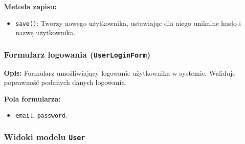 \documentclass[12pt,a4paper,oneside]{article}
\theoremstyle{definition}
\numberwithin{equation}{section}
\begin{document}
\textbf{Metoda zapisu:}
\begin{itemize}
    \item \texttt{save()}: Tworzy nowego użytkownika, ustawiając dla niego unikalne hasło i nazwę użytkownika.
\end{itemize}

\subsubsection*{Formularz logowania (\texttt{UserLoginForm})}

\textbf{Opis:}
Formularz umożliwiający logowanie użytkownika w systemie. Waliduje poprawność podanych danych logowania.

\textbf{Pola formularza:}
\begin{itemize}
    \item \texttt{email}, \texttt{password}.
\end{itemize}

\subsubsection{Widoki modelu \texttt{User}}
\end{document}
